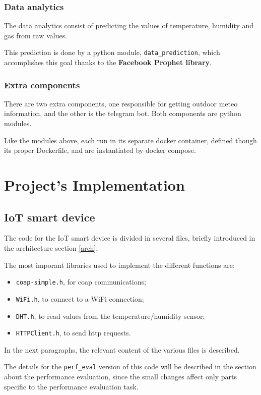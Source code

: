 \documentclass[]{article}
\begin{document}
\subsubsection{Data analytics}
The data analytics consist of predicting the values of temperature, humidity and gas from raw values.

This prediction is done by a python module, \texttt{data\_prediction}, which accomplishes this goal thanks to the \textbf{Facebook Prophet library}. 

\subsubsection{Extra components}
There are two extra components, one responsible for getting outdoor meteo information, and the other is the telegram bot. Both components are python modules.

Like the modules above, each run in its separate docker container, defined though its proper Dockerfile, and are instantiated by docker compose. 

\section{Project's Implementation}
\subsection{IoT smart device}
The code for the IoT smart device is divided in several files, briefly introduced in the architecture section \ref{arch}.

The most imporant libraries used to implement the different functions are:
\begin{itemize}
	\item \texttt{coap-simple.h}, for coap communications;
	\item \texttt{WiFi.h}, to connect to a WiFi connection;
	\item \texttt{DHT.h}, to read values from the temperature/humidity sensor;
	\item \texttt{HTTPClient.h}, to send http requests.
\end{itemize}

In the next paragraphs, the relevant content of the various files is described.

The details for the \texttt{perf\_eval} version of this code will be described in the section about the performance evaluation, since the small changes affect only parts specific to the performance evaluation task.
\end{document}
